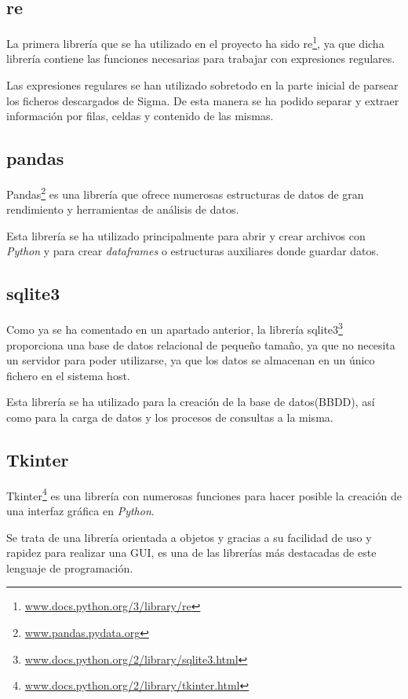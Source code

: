 \subsection{re}
La primera librería que se ha utilizado en el proyecto ha sido re\footnote{\href {https://docs.python.org/3/library/re.html}{www.docs.python.org/3/library/re}}, ya que dicha librería contiene las funciones necesarias para trabajar con expresiones regulares.

Las expresiones regulares se han utilizado sobretodo en la parte inicial de parsear los ficheros descargados de Sigma. De esta manera se ha podido separar y extraer información por filas, celdas y contenido de las mismas.


\subsection{pandas}
Pandas\footnote{\href{https://pandas.pydata.org/}{www.pandas.pydata.org}} es una librería que ofrece numerosas estructuras de datos de gran rendimiento y herramientas de análisis de datos.

Esta librería se ha utilizado principalmente para abrir y crear archivos con \emph{Python} y para crear \emph{dataframes} o estructuras auxiliares donde guardar datos.  


\subsection{sqlite3}
Como ya se ha comentado en un apartado anterior, la librería sqlite3\footnote{\href{https://docs.python.org/2/library/sqlite3.html}{www.docs.python.org/2/library/sqlite3.html}} proporciona una base de datos relacional de pequeño tamaño, ya que no necesita un servidor para poder utilizarse, ya que los datos se almacenan en un único fichero en el sistema host.

Esta librería se ha utilizado para la creación de la base de datos(BBDD), así como para la carga de datos y los procesos de consultas a la misma.

\subsection{Tkinter}
Tkinter\footnote{\href{https://docs.python.org/2/library/tkinter.html}{www.docs.python.org/2/library/tkinter.html}} es una librería con numerosas funciones para hacer posible la creación de una interfaz gráfica en \emph{Python}.

Se trata de una librería orientada a objetos y gracias a su facilidad de uso y rapidez para realizar una GUI, es una de las librerías más destacadas de este lenguaje de programación.

